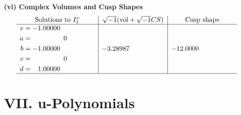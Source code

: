\documentclass[1p]{elsarticle_modified}
\theoremstyle{definition}
\newcommand{\I}{\sqrt{-1}}
\begin{document}
\newpage\flushleft \textbf{(vi) Complex Volumes and Cusp Shapes}
$$\begin{array}{c|c|c}  
\text{Solutions to }I^v_{1}& \I (\text{vol} + \sqrt{-1}CS) & \text{Cusp shape}\\
 \hline 
\begin{aligned}
v &= -1.00000\phantom{ +0.000000I} \\
a &= \phantom{-0.000000 } 0 \\
b &= -1.00000\phantom{ +0.000000I} \\
c &= \phantom{-0.000000 } 0 \\
d &= \phantom{-}1.00000\phantom{ +0.000000I}\end{aligned}
 & -3.28987\phantom{ +0.000000I} & -12.0000\phantom{ +0.000000I}\\
 \hline 
 \end{array}$$\newpage
\newpage\renewcommand{\arraystretch}{1}
\centering \section*{ VII. u-Polynomials}
\end{document}
